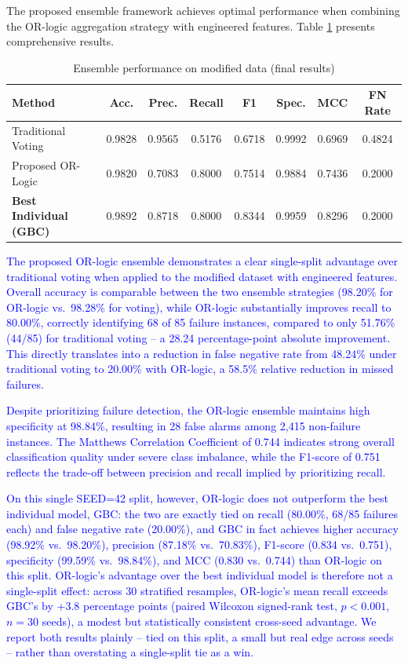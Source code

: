 The proposed ensemble framework achieves optimal performance when combining the OR-logic aggregation strategy with engineered features. Table \ref{tab:ensemble_modified} presents comprehensive results.

\begin{table}[htbp]
\centering
\caption{Ensemble performance on modified data (final results)}
\label{tab:ensemble_modified}
\begin{tabular}{lccccccc}
\hline
\textbf{Method} & \textbf{Acc.} & \textbf{Prec.} & \textbf{Recall} & \textbf{F1} & \textbf{Spec.} & \textbf{MCC} & \textbf{FN Rate} \\
\hline
Traditional Voting & 0.9828 & 0.9565 & 0.5176 & 0.6718 & 0.9992 & 0.6969 & 0.4824 \\
Proposed OR-Logic & 0.9820 & 0.7083 & 0.8000 & 0.7514 & 0.9884 & 0.7436 & 0.2000 \\
\hline
\textbf{Best Individual (GBC)} & 0.9892 & 0.8718 & 0.8000 & 0.8344 & 0.9959 & 0.8296 & 0.2000 \\
\hline
\end{tabular}
\end{table}

\textcolor{blue}{The proposed OR-logic ensemble demonstrates a clear single-split advantage over traditional voting when applied to the modified dataset with engineered features. Overall accuracy is comparable between the two ensemble strategies (98.20\% for OR-logic vs.\ 98.28\% for voting), while OR-logic substantially improves recall to 80.00\%, correctly identifying 68 of 85 failure instances, compared to only 51.76\% (44/85) for traditional voting -- a 28.24 percentage-point absolute improvement. This directly translates into a reduction in false negative rate from 48.24\% under traditional voting to 20.00\% with OR-logic, a 58.5\% relative reduction in missed failures.

Despite prioritizing failure detection, the OR-logic ensemble maintains high specificity at 98.84\%, resulting in 28 false alarms among 2,415 non-failure instances. The Matthews Correlation Coefficient of 0.744 indicates strong overall classification quality under severe class imbalance, while the F1-score of 0.751 reflects the trade-off between precision and recall implied by prioritizing recall.

On this single SEED=42 split, however, OR-logic does not outperform the best individual model, GBC: the two are exactly tied on recall (80.00\%, 68/85 failures each) and false negative rate (20.00\%), and GBC in fact achieves higher accuracy (98.92\% vs.\ 98.20\%), precision (87.18\% vs.\ 70.83\%), F1-score (0.834 vs.\ 0.751), specificity (99.59\% vs.\ 98.84\%), and MCC (0.830 vs.\ 0.744) than OR-logic on this split. OR-logic's advantage over the best individual model is therefore not a single-split effect: across 30 stratified resamples, OR-logic's mean recall exceeds GBC's by +3.8 percentage points (paired Wilcoxon signed-rank test, $p<0.001$, $n=30$ seeds), a modest but statistically consistent cross-seed advantage. We report both results plainly -- tied on this split, a small but real edge across seeds -- rather than overstating a single-split tie as a win.}

